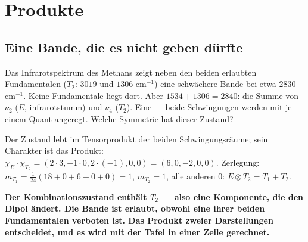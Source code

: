 \chapter{Produkte}

\section{Eine Bande, die es nicht geben dürfte}

\begin{merksatz}
Das Infrarotspektrum des Methans zeigt neben den beiden erlaubten Fundamentalen ($T_2$: $3019$ und $1306$ cm$^{-1}$) eine schwächere Bande bei etwa $2830$ cm$^{-1}$. Keine Fundamentale liegt dort. Aber $1534 + 1306 = 2840$: die Summe von $\nu_2$ ($E$, infrarotstumm) und $\nu_4$ ($T_2$). Eine  --- beide Schwingungen werden mit je einem Quant angeregt. Welche Symmetrie hat dieser Zustand?

Der Zustand lebt im Tensorprodukt der beiden Schwingungsräume; sein Charakter ist das Produkt: $\chi_E\cdot\chi_{T_2} = (2\cdot3, -1\cdot0, 2\cdot(-1), 0, 0) = (6, 0, -2, 0, 0)$. Zerlegung: $m_{T_1} = \frac1{24}(18 + 0 + 6 + 0 + 0) = 1$, $m_{T_2} = 1$, alle anderen $0$: $E\otimes T_2 = T_1 + T_2$.

\begin{center}
\begin{minipage}{0.9\textwidth}
\textbf{Der Kombinationszustand enthält $T_2$ --- also eine Komponente, die den Dipol ändert. Die Bande ist erlaubt, obwohl eine ihrer beiden Fundamentalen verboten ist. Das Produkt zweier Darstellungen entscheidet, und es wird mit der Tafel in einer Zeile gerechnet.}
\end{minipage}
\end{center}

\begin{center}
\begin{minipage}{0.88\textwidth}
\end{minipage}
\end{center}
\end{merksatz}

